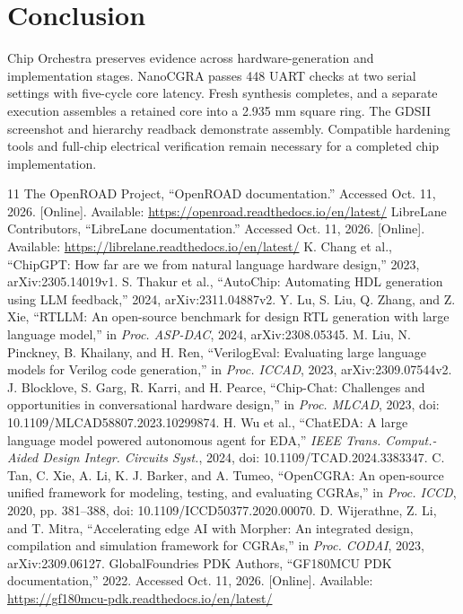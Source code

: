 \documentclass[conference,letterpaper]{IEEEtran}
\begin{document}
\section{Conclusion}
Chip Orchestra preserves evidence across hardware-generation and implementation stages. NanoCGRA passes 448 UART checks at two serial settings with five-cycle core latency. Fresh synthesis completes, and a separate execution assembles a retained core into a 2.935 mm square ring. The GDSII screenshot and hierarchy readback demonstrate assembly. Compatible hardening tools and full-chip electrical verification remain necessary for a completed chip implementation.

\clearpage
\begin{thebibliography}{11}
 The OpenROAD Project, ``OpenROAD documentation.'' Accessed Oct. 11, 2026. [Online]. Available: \url{https://openroad.readthedocs.io/en/latest/}
 LibreLane Contributors, ``LibreLane documentation.'' Accessed Oct. 11, 2026. [Online]. Available: \url{https://librelane.readthedocs.io/en/latest/}
 K. Chang et al., ``ChipGPT: How far are we from natural language hardware design,'' 2023, arXiv:2305.14019v1.
 S. Thakur et al., ``AutoChip: Automating HDL generation using LLM feedback,'' 2024, arXiv:2311.04887v2.
 Y. Lu, S. Liu, Q. Zhang, and Z. Xie, ``RTLLM: An open-source benchmark for design RTL generation with large language model,'' in \emph{Proc. ASP-DAC}, 2024, arXiv:2308.05345.
 M. Liu, N. Pinckney, B. Khailany, and H. Ren, ``VerilogEval: Evaluating large language models for Verilog code generation,'' in \emph{Proc. ICCAD}, 2023, arXiv:2309.07544v2.
 J. Blocklove, S. Garg, R. Karri, and H. Pearce, ``Chip-Chat: Challenges and opportunities in conversational hardware design,'' in \emph{Proc. MLCAD}, 2023, doi: 10.1109/MLCAD58807.2023.10299874.
 H. Wu et al., ``ChatEDA: A large language model powered autonomous agent for EDA,'' \emph{IEEE Trans. Comput.-Aided Design Integr. Circuits Syst.}, 2024, doi: 10.1109/TCAD.2024.3383347.
 C. Tan, C. Xie, A. Li, K. J. Barker, and A. Tumeo, ``OpenCGRA: An open-source unified framework for modeling, testing, and evaluating CGRAs,'' in \emph{Proc. ICCD}, 2020, pp. 381--388, doi: 10.1109/ICCD50377.2020.00070.
 D. Wijerathne, Z. Li, and T. Mitra, ``Accelerating edge AI with Morpher: An integrated design, compilation and simulation framework for CGRAs,'' in \emph{Proc. CODAI}, 2023, arXiv:2309.06127.
 GlobalFoundries PDK Authors, ``GF180MCU PDK documentation,'' 2022. Accessed Oct. 11, 2026. [Online]. Available: \url{https://gf180mcu-pdk.readthedocs.io/en/latest/}
\end{thebibliography}
\end{document}
